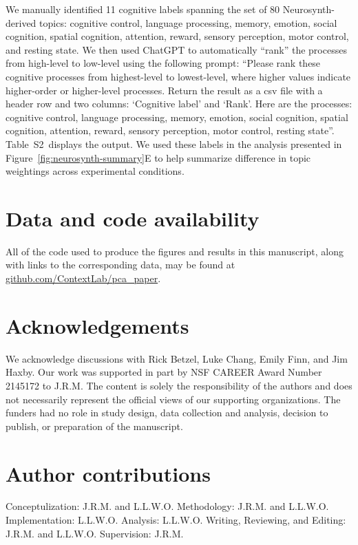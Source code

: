\documentclass[english, 11pt]{article}
\newcommand{\topicTags}{S2}
\begin{document}
We manually identified 11 cognitive labels
spanning the set of 80 Neurosynth-derived topics: cognitive control, language
processing, memory, emotion, social cognition, spatial cognition, attention,
reward, sensory perception, motor control, and resting state. We then used
ChatGPT to automatically ``rank'' the processes from high-level to low-level
using the following prompt: ``Please rank these cognitive processes from
highest-level to lowest-level, where higher values indicate higher-order or
higher-level processes. Return the result as a csv file with a header row and
two columns: `Cognitive label' and `Rank'. Here are the processes: cognitive
control, language processing, memory, emotion, social cognition, spatial
cognition, attention, reward, sensory perception, motor control, resting
state''.  Table~\topicTags~displays the output.  We used these labels in
the analysis presented in Figure~\ref{fig:neurosynth-summary}E to help summarize
difference in topic weightings across experimental conditions.





\section*{Data and code availability}

All of the code used to produce the figures and results in this manuscript,
along with links to the corresponding data, may be found at
\href{https://github.com/ContextLab/pca_paper}{github.com/ContextLab/pca\_paper}.

\section*{Acknowledgements} 

We acknowledge discussions with Rick Betzel, Luke Chang, Emily Finn, and Jim
Haxby. Our work was supported in part by NSF CAREER Award Number 2145172 to
J.R.M. The content is solely the responsibility of the authors and does not
necessarily represent the official views of our supporting organizations. The
funders had no role in study design, data collection and analysis, decision to
publish, or preparation of the manuscript.


\section*{Author contributions} 

Conceptulization: J.R.M. and L.L.W.O. Methodology: J.R.M. and L.L.W.O.
Implementation: L.L.W.O. Analysis: L.L.W.O. Writing, Reviewing, and Editing:
J.R.M. and L.L.W.O. Supervision: J.R.M.



\end{document}
